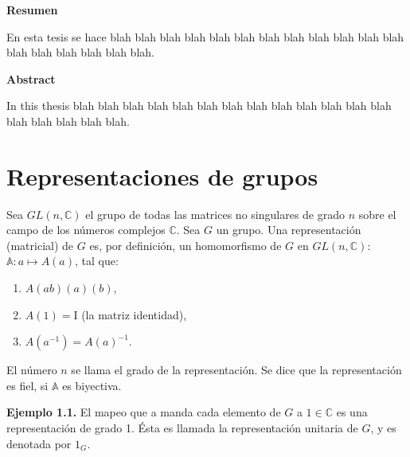 \documentclass[12pt]{book}
\theoremstyle{definition}
\newcounter{in}
\newcounter{ini}
\begin{document}
\thispagestyle{empty}
\begin{flushleft}
  {\bfseries\Large Resumen}
\end{flushleft}

En esta tesis se hace blah blah blah blah blah blah blah blah blah
blah blah blah blah blah blah blah blah blah.

\vspace{2cm}

\begin{flushleft}
  {\bfseries\Large Abstract}
\end{flushleft}

In this thesis blah blah blah blah blah blah blah blah blah
blah blah blah blah blah blah blah blah blah.

 \newpage \thispagestyle{empty}

\chapter{Representaciones de grupos}
\label{cha:Representaciones de grupos}

Sea $GL\left(n,\mathbb{C}\right)$ el grupo de todas las matrices no
singulares de grado $n$ sobre el campo de los números complejos
$\mathbb{C}$. Sea $G$ un grupo. Una representación (matricial) de $G$
es, por definición, un homomorfismo de $G$ en
$GL\left(n,\mathbb{C}\right)$: $\mathbb{A}\colon a\mapsto
A\left(a\right)$, tal que:
\begin{enumerate}
\item $A\left(ab\right)\left(a\right)\left(b\right)$,
\item $A\left(1\right)=\mathrm{I}$ (la matriz identidad),
\item $A\left(a^{-1}\right)=A\left(a\right)^{-1}$.
\end{enumerate}
El número $n$ se llama el grado de la representación. Se dice que la
representación es fiel, si $\mathbb{A}$ es biyectiva.

\textbf{Ejemplo 1.1.} El mapeo que a manda cada elemento de $G$ a $1
\in \mathbb{C}$ es una representación de grado 1. Ésta es llamada la
representación unitaria de $G$, y es denotada por $1_{G}$.
\end{document}
